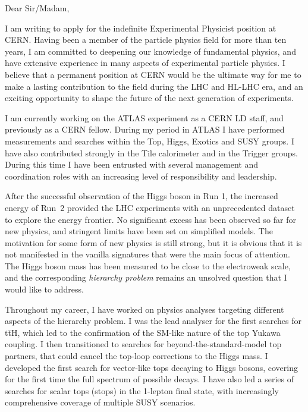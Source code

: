 \documentclass[11pt,a4paper,sans]{moderncv}        %
\begin{document}
\makecvtitle
\cvitem{}{
}
\vspace{3.4 cm}
Dear Sir/Madam,
\newline

I am writing to apply for the indefinite Experimental Physicist position at CERN.
Having been a member of the particle physics field for more than ten years, I am committed to deepening our knowledge of fundamental physics, and have extensive experience in many aspects of experimental particle physics. I believe that a permanent position at CERN would be the ultimate way for me to make a lasting contribution to the field during the LHC and HL-LHC era, and an exciting opportunity to shape the future of the next generation of experiments.
\newline

I am currently working on the ATLAS experiment as a CERN LD staff, and previously as a CERN fellow. 
During my period in ATLAS I have performed measurements and searches within the Top, Higgs, Exotics and SUSY groups. I have also contributed strongly in the Tile calorimeter and in the Trigger groups. During this time I have been entrusted with several management and coordination roles with an increasing level of responsibility and leadership. 
\newline

After the successful observation of the Higgs boson in Run 1, the increased energy of Run~2 provided the LHC experiments with an unprecedented dataset to explore the energy frontier. No significant excess has been observed so far for new physics, and stringent limits have been set on simplified models.
The motivation for some form of new physics is still strong, but it is obvious that it is not manifested in the vanilla signatures that were the main focus of attention.
The Higgs boson mass has been measured to be close to the electroweak scale, and the corresponding \emph{hierarchy problem} remains an unsolved question that I would like to address.
\newline

Throughout my career, I have worked on physics analyses targeting different aspects of the hierarchy problem. I was the lead analyser for the first searches for t\=tH, which led to the confirmation of the SM-like nature of the top Yukawa coupling. I then transitioned to searches for beyond-the-standard-model top partners, that could cancel the top-loop corrections to the Higgs mass. I developed the first search for vector-like tops decaying to Higgs bosons, covering for the first time the full spectrum of possible decays. I have also led a series of searches for scalar tops (stops) in the 1-lepton final state, with increasingly comprehensive coverage of multiple SUSY scenarios.
\newline
\end{document}
